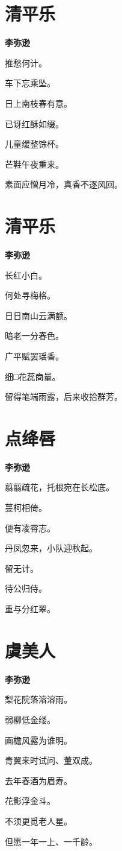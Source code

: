 \documentclass[12pt,a4paper]{ctexbook}
\begin{document}
\section{清平乐}
\textbf{李弥逊}\par\vspace{0.5em}
推愁何计。\par
车下忘乘坠。\par
日上南枝春有意。\par
已讶红酥如缀。\par
儿童缓整馀杯。\par
芒鞋午夜重来。\par
素面应憎月冷，真香不逐风回。\par

\section{清平乐}
\textbf{李弥逊}\par\vspace{0.5em}
长红小白。\par
何处寻梅格。\par
日日南山云满额。\par
暗老一分春色。\par
广平赋罢瑶香。\par
细□花蕊商量。\par
留得笔端雨露，后来收拾群芳。\par

\section{点绛唇}
\textbf{李弥逊}\par\vspace{0.5em}
翦翦疏花，托根宛在长松底。\par
蔓柯相倚。\par
便有凌霄志。\par
丹凤忽来，小队迎秋起。\par
留无计。\par
待公归侍。\par
重与分红翠。\par

\section{虞美人}
\textbf{李弥逊}\par\vspace{0.5em}
梨花院落溶溶雨。\par
弱柳低金缕。\par
画檐风露为谁明。\par
青翼来时试问、董双成。\par
去年春酒为眉寿。\par
花影浮金斗。\par
不须更觅老人星。\par
但愿一年一上、一千龄。\par
\end{document}

